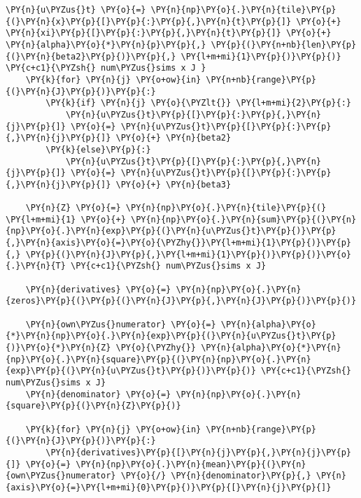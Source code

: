 \begin{tcolorbox}[breakable, size=fbox, boxrule=1pt, pad at break*=1mm,colback=cellbackground, colframe=cellborder]
\begin{Verbatim}[commandchars=\\\{\}]
    \PY{n}{u\PYZus{}t} \PY{o}{=} \PY{n}{np}\PY{o}{.}\PY{n}{tile}\PY{p}{(}\PY{n}{x}\PY{p}{[}\PY{p}{:}\PY{p}{,}\PY{n}{t}\PY{p}{]} \PY{o}{+} \PY{n}{xi}\PY{p}{[}\PY{p}{:}\PY{p}{,}\PY{n}{t}\PY{p}{]} \PY{o}{+} \PY{n}{alpha}\PY{o}{*}\PY{n}{p}\PY{p}{,} \PY{p}{(}\PY{n+nb}{len}\PY{p}{(}\PY{n}{beta2}\PY{p}{)}\PY{p}{,} \PY{l+m+mi}{1}\PY{p}{)}\PY{p}{)} \PY{c+c1}{\PYZsh{} num\PYZus{}sims x J }
    \PY{k}{for} \PY{n}{j} \PY{o+ow}{in} \PY{n+nb}{range}\PY{p}{(}\PY{n}{J}\PY{p}{)}\PY{p}{:}
        \PY{k}{if} \PY{n}{j} \PY{o}{\PYZlt{}} \PY{l+m+mi}{2}\PY{p}{:}
            \PY{n}{u\PYZus{}t}\PY{p}{[}\PY{p}{:}\PY{p}{,}\PY{n}{j}\PY{p}{]} \PY{o}{=} \PY{n}{u\PYZus{}t}\PY{p}{[}\PY{p}{:}\PY{p}{,}\PY{n}{j}\PY{p}{]} \PY{o}{+} \PY{n}{beta2}
        \PY{k}{else}\PY{p}{:}
            \PY{n}{u\PYZus{}t}\PY{p}{[}\PY{p}{:}\PY{p}{,}\PY{n}{j}\PY{p}{]} \PY{o}{=} \PY{n}{u\PYZus{}t}\PY{p}{[}\PY{p}{:}\PY{p}{,}\PY{n}{j}\PY{p}{]} \PY{o}{+} \PY{n}{beta3}

    \PY{n}{Z} \PY{o}{=} \PY{n}{np}\PY{o}{.}\PY{n}{tile}\PY{p}{(} \PY{l+m+mi}{1} \PY{o}{+} \PY{n}{np}\PY{o}{.}\PY{n}{sum}\PY{p}{(}\PY{n}{np}\PY{o}{.}\PY{n}{exp}\PY{p}{(}\PY{n}{u\PYZus{}t}\PY{p}{)}\PY{p}{,}\PY{n}{axis}\PY{o}{=}\PY{o}{\PYZhy{}}\PY{l+m+mi}{1}\PY{p}{)}\PY{p}{,} \PY{p}{(}\PY{n}{J}\PY{p}{,}\PY{l+m+mi}{1}\PY{p}{)}\PY{p}{)}\PY{o}{.}\PY{n}{T} \PY{c+c1}{\PYZsh{} num\PYZus{}sims x J}

    \PY{n}{derivatives} \PY{o}{=} \PY{n}{np}\PY{o}{.}\PY{n}{zeros}\PY{p}{(}\PY{p}{(}\PY{n}{J}\PY{p}{,}\PY{n}{J}\PY{p}{)}\PY{p}{)}

    \PY{n}{own\PYZus{}numerator} \PY{o}{=} \PY{n}{alpha}\PY{o}{*}\PY{n}{np}\PY{o}{.}\PY{n}{exp}\PY{p}{(}\PY{n}{u\PYZus{}t}\PY{p}{)}\PY{o}{*}\PY{n}{Z} \PY{o}{\PYZhy{}} \PY{n}{alpha}\PY{o}{*}\PY{n}{np}\PY{o}{.}\PY{n}{square}\PY{p}{(}\PY{n}{np}\PY{o}{.}\PY{n}{exp}\PY{p}{(}\PY{n}{u\PYZus{}t}\PY{p}{)}\PY{p}{)} \PY{c+c1}{\PYZsh{} num\PYZus{}sims x J}
    \PY{n}{denominator} \PY{o}{=} \PY{n}{np}\PY{o}{.}\PY{n}{square}\PY{p}{(}\PY{n}{Z}\PY{p}{)}

    \PY{k}{for} \PY{n}{j} \PY{o+ow}{in} \PY{n+nb}{range}\PY{p}{(}\PY{n}{J}\PY{p}{)}\PY{p}{:}
        \PY{n}{derivatives}\PY{p}{[}\PY{n}{j}\PY{p}{,}\PY{n}{j}\PY{p}{]} \PY{o}{=} \PY{n}{np}\PY{o}{.}\PY{n}{mean}\PY{p}{(}\PY{n}{own\PYZus{}numerator} \PY{o}{/} \PY{n}{denominator}\PY{p}{,} \PY{n}{axis}\PY{o}{=}\PY{l+m+mi}{0}\PY{p}{)}\PY{p}{[}\PY{n}{j}\PY{p}{]}


\end{Verbatim}
\end{tcolorbox}
